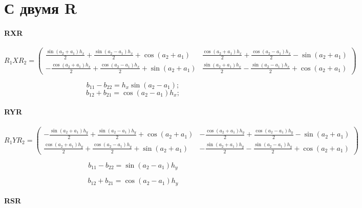 \section{С двумя R}

\paragraph{RXR}

$$R_1XR_2 = 
\begin{pmatrix}
 \frac{\sin{\left( {a_2}+{a_1}\right) } {h_x}}{2}+\frac{\sin{\left( {a_2}-{a_1}\right) } {h_x}}{2}+\cos{\left( {a_2}+{a_1}\right) } & 
 \frac{\cos{\left( {a_2}+{a_1}\right) } {h_x}}{2}+\frac{\cos{\left( {a_2}-{a_1}\right) } {h_x}}{2}-\sin{\left( {a_2}+{a_1}\right) } \\
-\frac{\cos{\left( {a_2}+{a_1}\right) } {h_x}}{2}+\frac{\cos{\left( {a_2}-{a_1}\right) } {h_x}}{2}+\sin{\left( {a_2}+{a_1}\right) } & 
 \frac{\sin{\left( {a_2}+{a_1}\right) } {h_x}}{2}-\frac{\sin{\left( {a_2}-{a_1}\right) } {h_x}}{2}+\cos{\left( {a_2}+{a_1}\right) }
\end{pmatrix}
$$

$$b_{11} - b_{22} = h_x \sin(a_2 - a_1);$$
$$b_{12} + b_{21} = \cos{\left( {a_2}-{a_1}\right) } {h_x} ;$$

\paragraph{RYR}

$$R_1YR_2 =
\begin{pmatrix}
-\frac{\sin{\left( {a_2}+{a_1}\right) } {h_y}}{2}+\frac{\sin{\left( {a_2}-{a_1}\right) } {h_y}}{2}+\cos{\left( {a_2}+{a_1}\right) } & 
-\frac{\cos{\left( {a_2}+{a_1}\right) } {h_y}}{2}+\frac{\cos{\left( {a_2}-{a_1}\right) } {h_y}}{2}-\sin{\left( {a_2}+{a_1}\right) }\\
 \frac{\cos{\left( {a_2}+{a_1}\right) } {h_y}}{2}+\frac{\cos{\left( {a_2}-{a_1}\right) } {h_y}}{2}+\sin{\left( {a_2}+{a_1}\right) } & 
-\frac{\sin{\left( {a_2}+{a_1}\right) } {h_y}}{2}-\frac{\sin{\left( {a_2}-{a_1}\right) } {h_y}}{2}+\cos{\left( {a_2}+{a_1}\right) }
\end{pmatrix}
$$

$$b_{11} - b_{22} = \sin{\left( {a_2}-{a_1}\right) } {h_y} $$

$$b_{12} + b_{21} = \cos{\left( {a_2}-{a_1}\right) } {h_y} $$


\paragraph{RSR}

